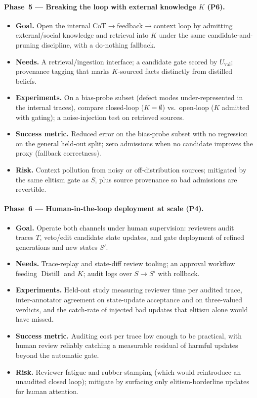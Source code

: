 \paragraph{Phase~5 --- Breaking the loop with external knowledge $K$ (P6).}
\begin{itemize}
  \item \textbf{Goal.} Open the internal CoT$\rightarrow$feedback$\rightarrow$context
    loop by admitting external/social knowledge and retrieval into $K$ under the
    same candidate-and-pruning discipline, with a do-nothing fallback.
  \item \textbf{Needs.} A retrieval/ingestion interface; a candidate gate scored
    by $U_{\mathrm{val}}$; provenance tagging that marks $K$-sourced facts
    distinctly from distilled beliefs.
  \item \textbf{Experiments.} On a bias-probe subset (defect modes
    under-represented in the internal traces), compare closed-loop
    ($K=\emptyset$) vs.\ open-loop ($K$ admitted with gating); a noise-injection
    test on retrieved sources.
  \item \textbf{Success metric.} Reduced error on the bias-probe subset with no
    regression on the general held-out split; zero admissions when no candidate
    improves the proxy (fallback correctness).
  \item \textbf{Risk.} Context pollution from noisy or off-distribution sources;
    mitigated by the same elitism gate as $S$, plus source provenance so bad
    admissions are revertible.
\end{itemize}

\paragraph{Phase~6 --- Human-in-the-loop deployment at scale (P4).}
\begin{itemize}
  \item \textbf{Goal.} Operate both channels under human supervision: reviewers
    audit traces $T$, veto/edit candidate state updates, and gate deployment of
    refined generations and new states $S'$.
  \item \textbf{Needs.} Trace-replay and state-diff review tooling; an approval
    workflow feeding $\operatorname{Distill}$ and $K$; audit logs over
    $S\!\rightarrow\!S'$ with rollback.
  \item \textbf{Experiments.} Held-out study measuring reviewer time per audited
    trace, inter-annotator agreement on state-update acceptance and on
    three-valued verdicts, and the catch-rate of injected bad updates that
    elitism alone would have missed.
  \item \textbf{Success metric.} Auditing cost per trace low enough to be
    practical, with human review reliably catching a measurable residual of
    harmful updates beyond the automatic gate.
  \item \textbf{Risk.} Reviewer fatigue and rubber-stamping (which would
    reintroduce an unaudited closed loop); mitigate by surfacing only
    elitism-borderline updates for human attention.
\end{itemize}

